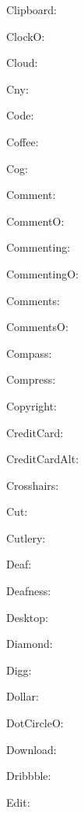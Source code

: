 \documentclass{article}
\begin{document}
      Clipboard: \faClipboard\ 

      ClockO: \faClockO\ 

      Cloud: \faCloud\ 

      Cny: \faCny\ 

      Code: \faCode\ 

      Coffee: \faCoffee\ 

      Cog: \faCog\ 

      Comment: \faComment\ 

      CommentO: \faCommentO\ 

      Commenting: \faCommenting\ 

      CommentingO: \faCommentingO\ 

      Comments: \faComments\ 

      CommentsO: \faCommentsO\ 

      Compass: \faCompass\ 

      Compress: \faCompress\ 

      Copyright: \faCopyright\ 

      CreditCard: \faCreditCard\ 

      CreditCardAlt: \faCreditCardAlt\ 

      Crosshairs: \faCrosshairs\ 

      Cut: \faCut\ 

      Cutlery: \faCutlery\ 

      Deaf: \faDeaf\ 

      Deafness: \faDeafness\ 

      Desktop: \faDesktop\ 

      Diamond: \faDiamond\ 

      Digg: \faDigg\ 

      Dollar: \faDollar\ 

      DotCircleO: \faDotCircleO\ 

      Download: \faDownload\ 

      Dribbble: \faDribbble\ 

      Edit: \faEdit\ 
\end{document}
